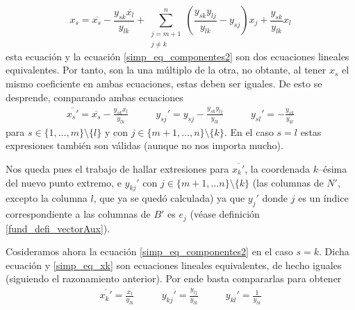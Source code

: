 \begin{equation*}
	x_s=\overline{x_s}-\frac{y_{sk}\overline{x_l}}{y_{lk}}+\sum_{\substack{j=m+1\\j\not=k}}^{n}\left(\frac{y_{sk}y_{lj}}{y_{lk}}-y_{sj}\right)x_j+\frac{y_{sk}}{y_{lk}}x_l
\end{equation*}
esta ecuación y la ecuación \eqref{simp_eq_componentes2} son dos ecuaciones lineales equivalentes. Por tanto, son la una múltiplo de la otra, no obtante, al tener $x_s$ el mismo coeficiente en ambas ecuaciones, estas deben ser iguales. De esto se desprende, comparando ambas ecuaciones
\begin{equation}
\label{simp_eq_aux1}
	\begin{array}{ccc}
		\displaystyle{\overline{x_s'}=\overline{x_s}-\frac{y_{sk}\overline{x_l}}{y_{lk}}}&\qquad
		\displaystyle{y_{sj}'=y_{sj}-\frac{y_{sk}y_{lj}}{y_{lk}}}&\qquad\displaystyle{y_{sl}'}=-\frac{y_{sk}}{y_{kl}}
	\end{array}
\end{equation}
para $s\in\{1,\dots,m\}\setminus\{l\}$ y con $j\in\{m+1,\dots,n\}\setminus\{k\}$. En el caso $s=l$ estas expresiones también son válidas (aunque no nos importa mucho).

Nos queda pues el trabajo de hallar extresiones para $\overline{x_k'}$, la coordenada $k$--ésima del nuevo punto extremo, e $y_{kj}'$ con $j\in\{m+1,\dots n\}\setminus\{k\}$ (las columnas de $N'$, excepto la columna $l$, que ya se quedó calculada) ya que $y_j'$ donde $j$ es un índice correspondiente a las columnas de $B'$ es $e_j$ (véase definición \ref{fund_defi_vectorAux}).

Cosideramos ahora la ecuación \eqref{simp_eq_componentes2} en el caso $s=k$. Dicha ecuación y \eqref{simp_eq_xk} son ecuaciones lineales equivalentes, de hecho iguales (siguiendo el razonamiento anterior). Por ende basta compararlas para obtener
\begin{equation}
\label{simp_eq_aux2}
	\begin{array}{ccc}
	\displaystyle{\overline{x_k'}=\frac{\overline{x_l}}{y_{lk}}} \qquad&\displaystyle{ y_{kj}'=\frac{y_{lj}}{y_{lk}}}\qquad&\displaystyle{y_{kl}'=\frac{1}{y_{lk}}}
	\end{array}
\end{equation}
